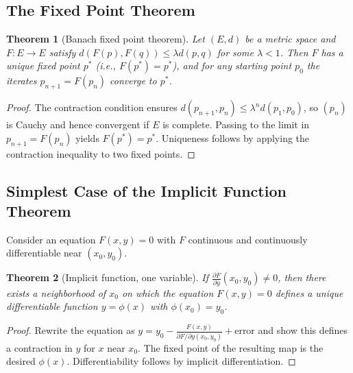 \documentclass{article}
\theoremstyle{definition}
\theoremstyle{plain}
\newtheorem{theorem}{Theorem}[section]
\begin{document}
\subsection{The Fixed Point Theorem}\label{subsec:fixed-point}
\begin{theorem}[Banach fixed point theorem]
	Let $(E,d)$ be a metric space and $F\colon E\to E$ satisfy $d(F(p),F(q)) \le \lambda d(p,q)$ for some $\lambda<1$. Then $F$ has a unique fixed point $p^\ast$ (i.e., $F(p^\ast)=p^\ast$), and for any starting point $p_0$ the iterates $p_{n+1}=F(p_n)$ converge to $p^\ast$.
\end{theorem}
\begin{proof}
	The contraction condition ensures $d(p_{n+1},p_n)\le \lambda^n d(p_1,p_0)$, so $(p_n)$ is Cauchy and hence convergent if $E$ is complete. Passing to the limit in $p_{n+1}=F(p_n)$ yields $F(p^\ast)=p^\ast$. Uniqueness follows by applying the contraction inequality to two fixed points.
\end{proof}

\subsection{Simplest Case of the Implicit Function Theorem}\label{subsec:implicit-simple}
Consider an equation $F(x,y)=0$ with $F$ continuous and continuously differentiable near $(x_0,y_0)$.
\begin{theorem}[Implicit function, one variable]
	If $\frac{\partial F}{\partial y}(x_0,y_0)\neq 0$, then there exists a neighborhood of $x_0$ on which the equation $F(x,y)=0$ defines a unique differentiable function $y=\phi(x)$ with $\phi(x_0)=y_0$.
\end{theorem}
\begin{proof}
	Rewrite the equation as $y = y_0 - \frac{F(x,y)}{\partial F/\partial y(x_0,y_0)} + \text{error}$ and show this defines a contraction in $y$ for $x$ near $x_0$. The fixed point of the resulting map is the desired $\phi(x)$. Differentiability follows by implicit differentiation.
\end{proof}
\end{document}
